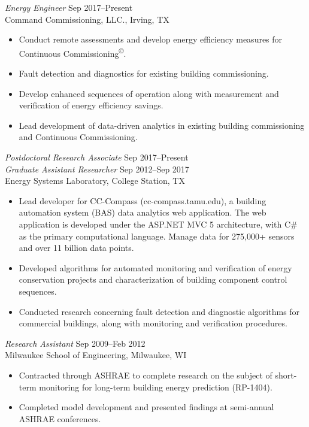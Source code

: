 \documentclass[margin]{res} %
\begin{document}
\begin{resume}
{\textit{Energy Engineer} \hfill Sep 2017--Present} \\
Command Commissioning, LLC., Irving, TX

\begin{itemize}\itemsep -2pt %
\item Conduct remote assessments and develop energy efficiency measures for Continuous Commissioning\textsuperscript{\copyright{}}.
\item Fault detection and diagnostics for existing building commissioning.
\item Develop enhanced sequences of operation along with measurement and verification of energy efficiency savings.
    \item Lead development of data-driven analytics in existing building
        commissioning and Continuous
        Commissioning\textsuperscript{\textregistered{}}.
\end{itemize}


{\sl Postdoctoral Research Associate}  \hfill Sep 2017--Present \\
{\sl Graduate Assistant Researcher} \hfill Sep 2012--Sep 2017 \\
Energy Systems Laboratory, College Station, TX

\begin{itemize} \itemsep -2pt %
    \item Lead developer for CC-Compass (cc-compass.tamu.edu), a building automation system (BAS) data
        analytics web application. The web application is developed
        under the ASP.NET MVC 5 architecture, with C\# as the primary
        computational language. Manage data for 275,000+ sensors and
        over 11 billion data points.
    \item Developed algorithms for automated monitoring and verification of energy conservation projects and characterization of building component control sequences.
    \item Conducted research concerning fault detection and diagnostic algorithms for commercial buildings, along with monitoring and verification procedures.
\end{itemize}

\vspace{10pt}

{\sl Research Assistant} \hfill Sep 2009--Feb 2012  \\
Milwaukee School of Engineering, Milwaukee, WI
\begin{itemize}\itemsep -2pt
\item Contracted through ASHRAE to complete research on the subject of short-term monitoring for long-term building energy prediction (RP-1404).
\item Completed model development and presented findings at semi-annual ASHRAE conferences.
\end{itemize}



\end{resume}
\end{document}
